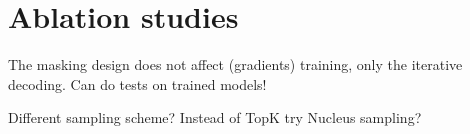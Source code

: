 \documentclass[../../thesis.tex]{subfiles}
\begin{document}
\section{Ablation studies}

The masking design does not affect (gradients) training, only the iterative decoding. Can do tests on trained models!

Different sampling scheme? Instead of TopK try Nucleus sampling?
\end{document}

